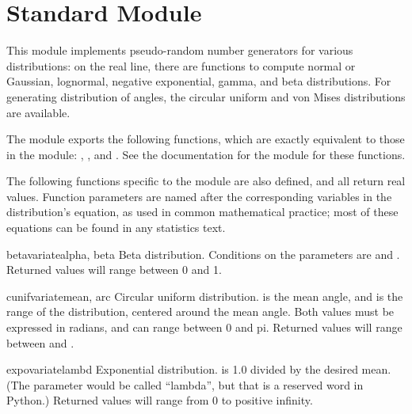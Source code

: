\section{Standard Module }



This module implements pseudo-random number generators for various
distributions: on the real line, there are functions to compute normal
or Gaussian, lognormal, negative exponential, gamma, and beta
distributions.  For generating distribution of angles, the circular
uniform and von Mises distributions are available.

The module exports the following functions, which are exactly
equivalent to those in the  module:
, ,  and
.  See the documentation for the 
module for these functions.

The following functions specific to the  module are also
defined, and all return real values.  Function parameters are named
after the corresponding variables in the distribution's equation, as
used in common mathematical practice; most of these equations can be
found in any statistics text.

\begin{funcdesc}{betavariate}{alpha, beta}
Beta distribution.  Conditions on the parameters are
 and .
Returned values will range between 0 and 1.
\end{funcdesc}

\begin{funcdesc}{cunifvariate}{mean, arc}
Circular uniform distribution.   is the mean angle, and
 is the range of the distribution, centered around the mean
angle.  Both values must be expressed in radians, and can range
between 0 and pi.  Returned values will range between
 and .
\end{funcdesc}

\begin{funcdesc}{expovariate}{lambd}
Exponential distribution.   is 1.0 divided by the desired
mean.  (The parameter would be called ``lambda'', but that is a
reserved word in Python.)  Returned values will range from 0 to
positive infinity.
\end{funcdesc}

